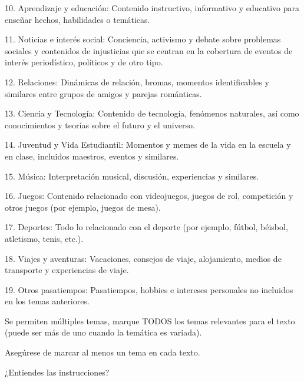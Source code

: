 10. Aprendizaje y educación: Contenido instructivo, informativo y educativo para enseñar hechos, habilidades o temáticas.

11. Noticias e interés social: Conciencia, activismo y debate sobre problemas sociales y contenidos de injusticias que se centran en la cobertura de eventos de interés periodístico, políticos y de otro tipo.

12. Relaciones: Dinámicas de relación, bromas, momentos identificables y similares entre grupos de amigos y parejas románticas.

13. Ciencia y Tecnología: Contenido de tecnología, fenómenos naturales, así como conocimientos y teorías sobre el futuro y el universo.

14. Juventud y Vida Estudiantil: Momentos y memes de la vida en la escuela y en clase, incluidos maestros, eventos y similares.

15. Música: Interpretación musical, discusión, experiencias y similares.

16. Juegos: Contenido relacionado con videojuegos, juegos de rol, competición y otros juegos (por ejemplo, juegos de mesa).

17. Deportes: Todo lo relacionado con el deporte (por ejemplo, fútbol, béisbol, atletismo, tenis, etc.).

18. Viajes y aventuras: Vacaciones, consejos de viaje, alojamiento, medios de transporte y experiencias de viaje.

19. Otros pasatiempos: Pasatiempos, hobbies e intereses personales no incluidos en los temas anteriores.

Se permiten múltiples temas, marque TODOS los temas relevantes para el texto (puede ser más de uno cuando la temática es variada).

Asegúrese de marcar al menos un tema en cada texto.
 
¿Entiendes las instrucciones?

